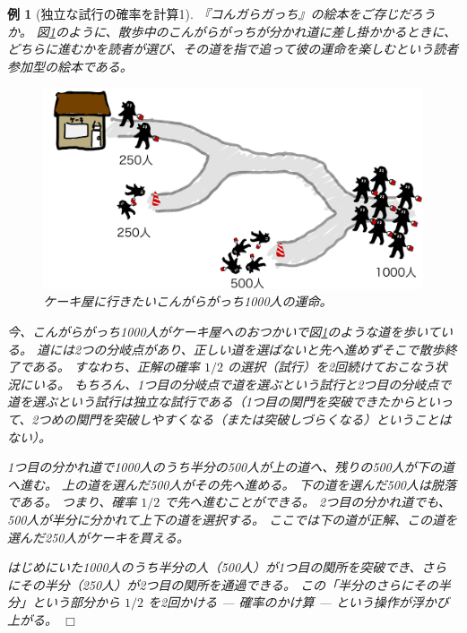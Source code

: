 \documentclass[12pt]{ltjsarticle}\usepackage{ifthen}\newcounter{enlarge}\setcounter{enlarge}{1}
\def\qed{\hfill $\Box$}
\newtheorem{eg}{例}
\begin{document}
\begin{eg}[独立な試行の確率を計算1]
  『コんガらガっち』の絵本をご存じだろうか。
  図\ref{f:2.2.2}のように、散歩中のこんがらがっちが分かれ道に差し掛かかるときに、どちらに進むかを読者が選び、その道を指で追って彼の運命を楽しむという読者参加型の絵本である。

  \begin{figure}[] 
    \centering 
    \includegraphics[width=12truecm]{./figure/f2-2-2.jpg}
    \captionsetup{width=.9\linewidth}
    \caption{%
      ケーキ屋に行きたいこんがらがっち1000人の運命。
    }
    \label{f:2.2.2}
  \end{figure}

  今、こんがらがっち1000人がケーキ屋へのおつかいで図\ref{f:2.2.2}のような道を歩いている。
  道には2つの分岐点があり、正しい道を選ばないと先へ進めずそこで散歩終了である。
  すなわち、正解の確率 $1/2$ の選択（試行）を2回続けておこなう状況にいる。
  もちろん、1つ目の分岐点で道を選ぶという試行と2つ目の分岐点で道を選ぶという試行は独立な試行である（1つ目の関門を突破できたからといって、2つめの関門を突破しやすくなる（または突破しづらくなる）ということはない）。

  1つ目の分かれ道で1000人のうち半分の500人が上の道へ、残りの500人が下の道へ進む。
  上の道を選んだ500人がその先へ進める。
  下の道を選んだ500人は脱落である。
  つまり、確率 $1/2$ で先へ進むことができる。
  2つ目の分かれ道でも、500人が半分に分かれて上下の道を選択する。
  ここでは下の道が正解、この道を選んだ250人がケーキを買える。

  はじめにいた1000人のうち半分の人（500人）が1つ目の関所を突破でき、さらにその半分（250人）が2つ目の関所を通過できる。
  この「半分のさらにその半分」という部分から $1/2$ を2回かける --- 確率のかけ算 --- という操作が浮かび上がる。
\qed\end{eg}
\end{document}
